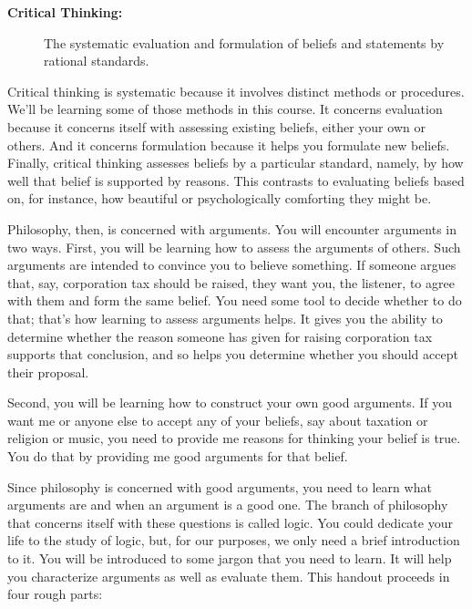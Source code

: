 \documentclass[report,oneside]{memoir}
\begin{document}
\begin{description}

\item[\textbf{Critical Thinking:} ]

The systematic evaluation and formulation of beliefs and statements by rational standards.
\end{description}
Critical thinking is systematic because it involves distinct methods or procedures. We'll be learning some of those methods in this course. It concerns evaluation because it concerns itself with assessing existing beliefs, either your own or others. And it concerns formulation because it helps you formulate new beliefs. Finally, critical thinking assesses beliefs by a particular standard, namely, by how well that belief is supported by reasons. This contrasts to evaluating beliefs based on, for instance, how beautiful or psychologically comforting they might be. 

Philosophy, then, is concerned with arguments. You will encounter arguments in two ways. First, you will be learning how to assess the arguments of others. Such arguments are intended to convince you to believe something. If someone argues that, say, corporation tax should be raised, they want you, the listener, to agree with them and form the same belief. You need some tool to decide whether to do that; that's how learning to assess arguments helps. It gives you the ability to determine whether the reason someone has given for raising corporation tax supports that conclusion, and so helps you determine whether you should accept their proposal. 

Second, you will be learning how to construct your own good arguments. If you want me or anyone else to accept any of your beliefs, say about taxation or religion or music, you need to provide me reasons for thinking your belief is true. You do that by providing me good arguments for that belief. 

Since philosophy is concerned with good arguments, you need to learn what arguments are and when an argument is a good one. The branch of philosophy that concerns itself with these questions is called logic. You could dedicate your life to the study of logic, but, for our purposes, we only need a brief introduction to it. You will be introduced to some jargon that you need to learn. It will help you characterize arguments as well as evaluate them. This handout proceeds in four rough parts: 
\end{document}
